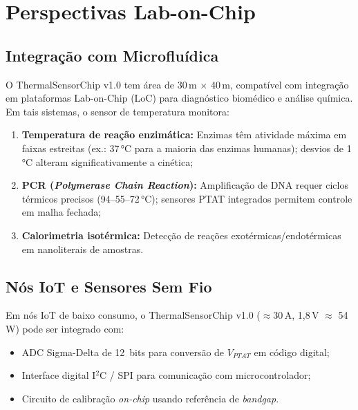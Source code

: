 \documentclass[12pt,a4paper]{article}
\begin{document}
\section{Perspectivas Lab-on-Chip}

\subsection{Integração com Microfluídica}

O ThermalSensorChip v1.0 tem área de 30\,\textmu m $\times$ 40\,\textmu m, compatível com
integração em plataformas Lab-on-Chip (LoC) para diagnóstico biomédico e análise química.
Em tais sistemas, o sensor de temperatura monitora:
\begin{enumerate}[leftmargin=2em,label=\textbf{(\arabic*)}]
  \item \textbf{Temperatura de reação enzimática:} Enzimas têm atividade máxima em faixas
        estreitas (ex.: 37\,°C para a maioria das enzimas humanas); desvios de 1\,°C alteram
        significativamente a cinética;
  \item \textbf{PCR (\textit{Polymerase Chain Reaction}):} Amplificação de DNA requer ciclos
        térmicos precisos (94--55--72\,°C); sensores PTAT integrados permitem controle
        em malha fechada;
  \item \textbf{Calorimetria isotérmica:} Detecção de reações exotérmicas/endotérmicas em
        nanoliterais de amostras.
\end{enumerate}

\subsection{Nós IoT e Sensores Sem Fio}

Em nós IoT de baixo consumo, o ThermalSensorChip v1.0 ($\approx$30\,\textmu A, 1,8\,V
$\approx$ 54\,\textmu W) pode ser integrado com:
\begin{itemize}
  \item ADC Sigma-Delta de 12~bits para conversão de $V_{PTAT}$ em código digital;
  \item Interface digital I$^2$C / SPI para comunicação com microcontrolador;
  \item Circuito de calibração \textit{on-chip} usando referência de \textit{bandgap}.
\end{itemize}
\end{document}
